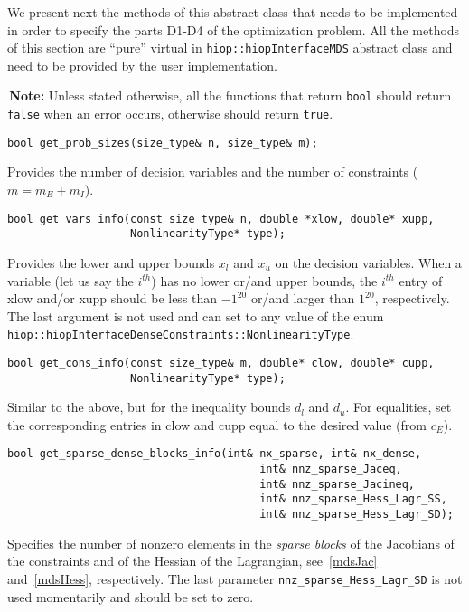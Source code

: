 \documentclass[11pt]{article}
\newcounter{line}
\newcommand{\warningSymbol}{\raisebox{0.9\depth}{\danger}}
\newcommand{\warningcp}[1]{%
        \smallskip \noindent \textcolor{warningColorText}{\warningSymbol{}}\,\textbf{#1} %
    }
\begin{document}
 We present next the methods of this abstract class that needs to be implemented in order to specify the parts D1-D4 of the optimization problem. All the methods of this section are ``pure'' virtual in \texttt{hiop::hiopInterfaceMDS} abstract class  and need to be provided by the user implementation.
 
 

\warningcp{Note:} Unless stated otherwise, all the functions that return \texttt{bool} should return \texttt{false} when an error occurs, otherwise should return \texttt{true}.

\begin{lstlisting} 
bool get_prob_sizes(size_type& n, size_type& m);
\end{lstlisting} 
\noindent Provides the number of decision variables and the number of constraints ($m=m_E+m_I$).


\begin{lstlisting} 
bool get_vars_info(const size_type& n, double *xlow, double* xupp, 
                   NonlinearityType* type);
\end{lstlisting} 

\noindent Provides the lower and upper bounds $x_l$ and $x_u$ on the decision variables. When a variable (let us say the $i^{th}$) has no lower or/and upper bounds, the  $i^{th}$ entry of xlow and/or xupp should be less than $-1^{20}$ or/and larger than $1^{20}$, respectively. The last argument is not used and can set to any value of the enum \texttt{hiop::hiopInterfaceDenseConstraints::NonlinearityType}.


\begin{lstlisting} 
bool get_cons_info(const size_type& m, double* clow, double* cupp, 
                   NonlinearityType* type);
\end{lstlisting}
\noindent Similar to the above, but for the inequality bounds $d_l$ and $d_u$. For equalities, set the corresponding entries in clow and cupp equal to the desired value (from $c_E$).

\begin{lstlisting} 
bool get_sparse_dense_blocks_info(int& nx_sparse, int& nx_dense,
					                   int& nnz_sparse_Jaceq, 
					                   int& nnz_sparse_Jacineq,
					                   int& nnz_sparse_Hess_Lagr_SS, 
					                   int& nnz_sparse_Hess_Lagr_SD);
\end{lstlisting}
\noindent Specifies the number of nonzero elements in the  \textit{sparse blocks} of the Jacobians of the constraints and of the Hessian of the Lagrangian, see~\eqref{mdsJac} and~\eqref{mdsHess}, respectively. The last parameter \texttt{nnz\_sparse\_Hess\_Lagr\_SD} is not used momentarily and should be set to zero.
\end{document}
